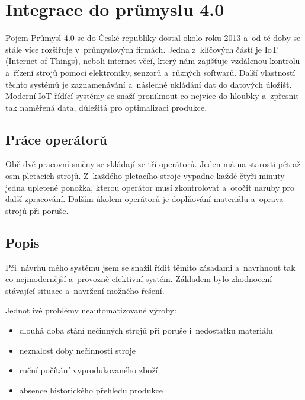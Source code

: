 \chapter{Integrace do průmyslu 4.0}
Pojem Průmysl 4.0 se do České republiky dostal okolo roku 2013 a~od té doby se stále více rozšiřuje v~průmyslových firmách.
Jedna z~klíčových částí je IoT (Internet of Things), neboli internet věcí, který nám zajišťuje vzdálenou kontrolu a~řízení strojů pomocí elektroniky, senzorů a~různých softwarů.
Další vlastností těchto systémů je zaznamenávání a~následné ukládání dat do datových úložišť.
Moderní IoT řídící systémy se snaží proniknout co nejvíce do hloubky a~zpřesnit tak naměřená data, důležitá pro optimalizaci produkce.   

\section{Práce operátorů}

Obě dvě pracovní směny se skládají ze tří operátorů. Jeden má na starosti pět až osm pletacích strojů.
Z~každého pletacího stroje vypadne každé čtyři minuty jedna upletené ponožka, kterou operátor musí zkontrolovat a~otočit naruby pro další zpracování.
Dalším úkolem operátorů je doplňování materiálu a~oprava strojů při poruše.

\section{Popis}
Při~návrhu mého systému jsem se snažil řídit těmito zásadami a~navrhnout tak co nejmodernější a~provozně efektivní systém.
Základem bylo zhodnocení stávající situace a~navržení možného řešení.

Jednotlivé problémy neautomatizované výroby:
\begin{itemize}
    \item dlouhá doba stání nečinných strojů při poruše i~nedostatku materiálu
    \item neznalost doby nečinnosti stroje
    \item ruční počítání vyprodukovaného zboží
    \item absence historického přehledu produkce
\end{itemize}

